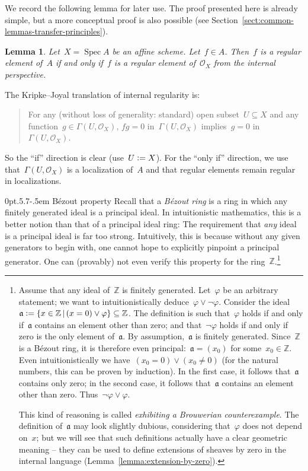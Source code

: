 \documentclass[10pt,reqno,a4paper]{amsbook}
\makeatletter
\theoremstyle{definition}
\theoremstyle{plain}
\newtheorem{lemma}[defn]{Lemma}
\theoremstyle{remark}
\newcommand{\ZZ}{\mathbb{Z}}
\renewcommand{\O}{\mathcal{O}}
\newcommand{\aaa}{\mathfrak{a}}
\DeclareMathOperator{\Spec}{Spec}
\newcommand{\?}{\,{:}\,}
\renewcommand{\_}{\mathpunct{.}\,}
\newcommand{\defeq}{\vcentcolon=}
\renewenvironment{proof}[1][\proofname]{\par
  \pushQED{\qed}%
  \normalfont \topsep6\p@\@plus6\p@\relax
  \trivlist
  \item[\hskip\labelsep
        \itshape
    #1\@addpunct{.}]\ignorespaces
}{%
  \popQED\endtrivlist\@endpefalse
}
\def\subsection{\@startsection{subsection}{2}%
  {0pt}{.5\linespacing\@plus.7\linespacing}{-.5em}%
  {\normalfont\bfseries}}
\makeatother
\begin{document}
We record the following lemma for later use. The proof presented here is
already simple, but a more conceptual proof is also possible (see
Section~\ref{sect:common-lemmas-transfer-principles}).
\begin{lemma}\label{lemma:regular-affine}
Let~$X = \Spec A$ be an affine scheme. Let~$f \in A$. Then~$f$ is
a regular element of~$A$ if and only if~$f$ is a regular element of~$\O_X$ from
the internal perspective.\end{lemma}
\begin{proof}The Kripke--Joyal translation of internal regularity is:
\begin{quote}For any (without loss of generality: standard) open subset~$U \subseteq X$ and any function~$g \in
\Gamma(U,\O_X)$, $fg = 0$ in~$\Gamma(U,\O_X)$ implies~$g = 0$
in~$\Gamma(U,\O_X)$.\end{quote}
So the ``if'' direction is clear (use~$U \defeq X$). For the ``only if'' direction,
we use that~$\Gamma(U,\O_X)$ is a localization of~$A$ and that regular elements
remain regular in localizations.
\end{proof}


\subsection{Bézout property} Recall that a \emph{Bézout ring} is a ring in
which any finitely generated ideal is a principal ideal. In intuitionistic
mathematics, this is a better notion than that of a principal ideal ring: The
requirement that \emph{any} ideal is a principal ideal is far too strong.
Intuitively, this is because without any given generators to begin with, one
cannot hope to explicitly pinpoint a principal generator.
One can (provably) not even verify this property for the ring~$\ZZ$.\footnote{\label{fn:z-principal-ideal-domain}Assume
that any ideal of~$\ZZ$ is finitely generated. Let~$\varphi$ be an arbitrary
statement; we want to intuitionistically deduce~$\varphi \vee \neg\varphi$.
Consider the ideal~$\aaa \defeq \{ x \in \ZZ \,|\, (x = 0) \vee \varphi \}
\subseteq \ZZ$. The definition is such that~$\varphi$ holds if and only
if~$\aaa$ contains an element other than zero; and that~$\neg\varphi$ holds if
and only if zero is the only element of~$\aaa$.
By assumption,~$\aaa$ is finitely generated. Since~$\ZZ$ is a
Bézout ring, it is therefore even principal:~$\aaa = (x_0)$ for some~$x_0 \in
\ZZ$. Even intuitionistically we have~$(x_0 = 0) \vee (x_0 \neq 0)$ (for the
natural numbers, this can be proven by induction). In the first case, it
follows that~$\aaa$ contains only zero; in the second case, it follows
that~$\aaa$ contains an element other than zero. Thus~$\neg\varphi \vee
\varphi$.

This kind of reasoning is called \emph{exhibiting a Brouwerian
counterexample}. The definition of~$\aaa$ may look slightly dubious,
considering that~$\varphi$ does not depend on~$x$; but we will see that such
definitions actually have a clear geometric meaning -- they can be used to
define extensions of sheaves by zero in the internal language
(Lemma~\ref{lemma:extension-by-zero}).}
\end{document}
